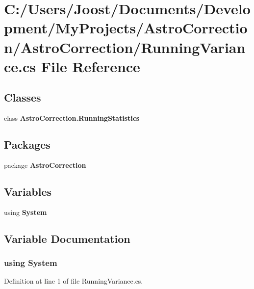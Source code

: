 \section{C:/Users/Joost/Documents/Development/MyProjects/AstroCorrection/AstroCorrection/RunningVariance.cs File Reference}
\label{_running_variance_8cs}
\subsection*{Classes}
\begin{DoxyCompactItemize}
\item 
class {\bf AstroCorrection.RunningStatistics}
\end{DoxyCompactItemize}
\subsection*{Packages}
\begin{DoxyCompactItemize}
\item 
package {\bf AstroCorrection}
\end{DoxyCompactItemize}
\subsection*{Variables}
\begin{DoxyCompactItemize}
\item 
﻿using {\bf System}
\end{DoxyCompactItemize}


\subsection{Variable Documentation}
\subsubsection[{System}]{\setlength{\rightskip}{0pt plus 5cm}﻿using {\bf System}}\label{_running_variance_8cs_a81a223a02c34d82b47199f08308847f2}


Definition at line 1 of file RunningVariance.cs.